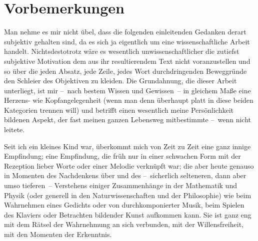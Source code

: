 \chapter*{Vorbemerkungen}\label{ch:introduction}

Man nehme es mir nicht übel, dass die folgenden einleitenden Gedanken derart
  subjektiv gehalten sind, da es sich ja eigentlich um eine wissenschaftliche Arbeit
  handelt.
Nichtsdestotrotz wäre es wesentlich unwissenschaftlicher die zutiefst
  subjektive Motivation dem aus ihr resultierendem Text nicht voranzustellen
  und so über die jeden Absatz, jede Zeile, jedes Wort durchdringenden
  Beweggründe den Schleier des Objektiven zu kleiden.
Die Grundahnung, die dieser Arbeit unterliegt, ist mir --~nach bestem Wissen
  und Gewissen~-- in gleichem Maße eine Herzens- wie Kopfangelegenheit (wenn
  man denn überhaupt platt in diese beiden Kategorien trennen will)
  und betrifft einen wesentlich meine Persönlichkeit bildenen 
  Aspekt, der fast meinen ganzen Lebensweg mitbestimmte --~wenn nicht leitete.

Seit ich ein kleines Kind war, überkommt mich von Zeit zu Zeit eine ganz
  innige Empfindung; eine Empfindung, die früh nur in einer schwachen Form 
  mit der Rezeption lieber Worte oder einer Melodie verknüpft war;
  die aber heute genauso in Momenten des Nachdenkens über und des
  --~sicherlich selteneren, dann aber umso tieferen~-- Verstehens einiger
  Zusammenhänge in der Mathematik und Physik (oder generell in den
  Naturwissenschaften und der Philosophie) wie beim Wahrnehmen eines Gedichts
  oder von durchkomponierter Musik, beim Spielen des Klaviers oder Betrachten
  bildender Kunst aufkommen kann.
Sie ist ganz eng mit dem Rätsel der Wahrnehmung an sich verbunden, mit der
  Willensfreiheit, mit den Momenten der Erkenntnis.

